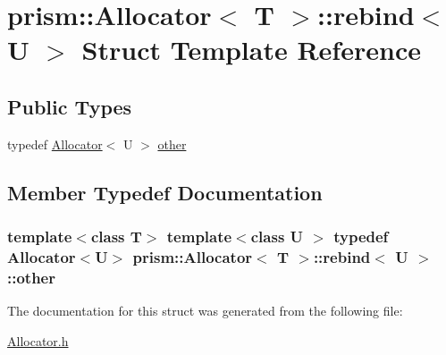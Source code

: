 \hypertarget{structprism_1_1_allocator_1_1rebind}{}\section{prism\+:\+:Allocator$<$ T $>$\+:\+:rebind$<$ U $>$ Struct Template Reference}
\label{structprism_1_1_allocator_1_1rebind}
\subsection*{Public Types}
\begin{DoxyCompactItemize}
\item 
typedef \hyperlink{classprism_1_1_allocator}{Allocator}$<$ U $>$ \hyperlink{structprism_1_1_allocator_1_1rebind_a67ad1b0f9c61151a3063a742b411ccc3}{other}
\end{DoxyCompactItemize}


\subsection{Member Typedef Documentation}
\subsubsection[{\texorpdfstring{other}{other}}]{\setlength{\rightskip}{0pt plus 5cm}template$<$class T$>$ template$<$class U $>$ typedef {\bf Allocator}$<$U$>$ {\bf prism\+::\+Allocator}$<$ T $>$\+::{\bf rebind}$<$ U $>$\+::{\bf other}}\hypertarget{structprism_1_1_allocator_1_1rebind_a67ad1b0f9c61151a3063a742b411ccc3}{}\label{structprism_1_1_allocator_1_1rebind_a67ad1b0f9c61151a3063a742b411ccc3}


The documentation for this struct was generated from the following file\+:\begin{DoxyCompactItemize}
\item 
\hyperlink{_allocator_8h}{Allocator.\+h}\end{DoxyCompactItemize}
